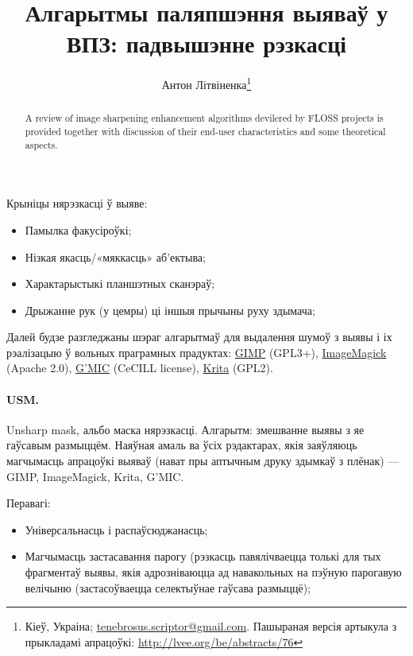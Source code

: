 \documentclass[10pt, a5paper]{article}
\begin{document}
\title{Алгарытмы паляпшэння выяваў у ВПЗ: падвышэнне рэзкасці}%

\author{Антон Літвіненка\footnote{Кіеў, Украіна; \url{tenebrosus.scriptor@gmail.com}. Пашыраная версія артыкула з прыкладамі апрацоўкі: \url{http://lvee.org/be/abstracts/76}}}
\maketitle

\begin{abstract}
A review of image sharpening enhancement algorithms devilered by FLOSS projects is provided together with discussion of their end-user characteristics and some theoretical aspects.
\end{abstract}

Крыніцы нярэзкасці ў выяве:
\begin{itemize}
  \item Памылка факусіроўкі;
  \item Нізкая якасць/«мяккасць» аб’ектыва;
  \item Характарыстыкі планшэтных сканэраў;
  \item Дрыжанне рук (у цемры) ці іншыя прычыны руху здымача;
\end{itemize}

Далей будзе разгледжаны шэраг алгарытмаў для выдалення шумоў з выявы і іх рэалізацыю ў вольных праграмных прадуктах: \href{http://www.gimp.org/}{GIMP} (GPL3+), \href{http://www.imagemagick.org/}{ImageMagick} (Apache 2.0), \href{http://gmic.sourceforge.net/}{G’MIC} (CeCILL license), \href{http://krita.org/}{Krita} (GPL2).

\paragraph*{USM.} Unsharp mask, альбо маска нярэзкасці. Алгарытм: змешванне выявы з яе гаўсавым размыццём. Наяўная амаль ва ўсіх рэдактарах, якія заяўляюць магчымасць апрацоўкі выяваў (нават пры аптычным друку здымкаў з плёнак) — {GIMP}, {ImageMagick}, {Krita}, {G'MIC}.

Перавагі:

\begin{itemize}
  \item Універсальнасць і распаўсюджанасць;
  \item Магчымасць застасавання парогу (рэзкасць павялічваецца толькі для тых фрагментаў выявы, якія адрозніваюцца ад навакольных на пэўную парогавую велічыню (застасоўваецца селектыўнае гаўсава размыццё);
\end{itemize}
\end{document}
